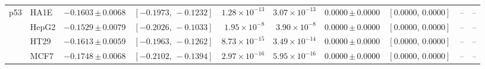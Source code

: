 \documentclass[11pt,a4paper]{article}
\begin{document}
\begin{landscape}
\begin{table}[p]
{\begin{tabular}{@{}llrrrrrrrr@{}}
\midrule

\multirow[c]{4}{*}{p53}
& HA1E
& \(-0.1603\,{\scriptstyle\pm\,0.0068}\)
& \([-0.1973,\,-0.1232]\)
& \(1.28\times10^{-13}\)
& \(3.07\times10^{-13}\)
& \(0.0000\,{\scriptstyle\pm\,0.0000}\)
& \([0.0000,\,0.0000]\)
& \textit{--}
& \textit{--} \\

& HepG2
& \(-0.1529\,{\scriptstyle\pm\,0.0079}\)
& \([-0.2026,\,-0.1033]\)
& \(1.95\times10^{-8}\)
& \(3.90\times10^{-8}\)
& \(0.0000\,{\scriptstyle\pm\,0.0000}\)
& \([0.0000,\,0.0000]\)
& \textit{--}
& \textit{--} \\

& HT29
& \(-0.1613\,{\scriptstyle\pm\,0.0059}\)
& \([-0.1963,\,-0.1262]\)
& \(8.73\times10^{-15}\)
& \(3.49\times10^{-14}\)
& \(0.0000\,{\scriptstyle\pm\,0.0000}\)
& \([0.0000,\,0.0000]\)
& \textit{--}
& \textit{--} \\

& MCF7
& \(-0.1748\,{\scriptstyle\pm\,0.0068}\)
& \([-0.2102,\,-0.1394]\)
& \(2.97\times10^{-16}\)
& \(5.95\times10^{-16}\)
& \(0.0000\,{\scriptstyle\pm\,0.0000}\)
& \([0.0000,\,0.0000]\)
& \textit{--}
& \textit{--} \\

\bottomrule

\end{tabular}%
}

\end{table}

\endgroup
\end{landscape}
\clearpage
\end{document}
